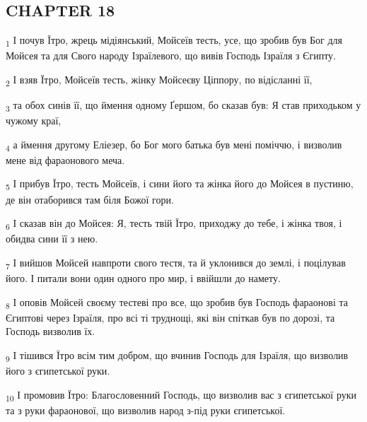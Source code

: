 \subsection{CHAPTER 18}
\begin{tcolorbox}
\textsubscript{1} І почув Їтро, жрець мідіянський, Мойсеїв тесть, усе, що зробив був Бог для Мойсея та для Свого народу Ізраїлевого, що вивів Господь Ізраїля з Єгипту.
\end{tcolorbox}
\begin{tcolorbox}
\textsubscript{2} І взяв Їтро, Мойсеїв тесть, жінку Мойсеєву Ціппору, по відісланні її,
\end{tcolorbox}
\begin{tcolorbox}
\textsubscript{3} та обох синів її, що ймення одному Ґершом, бо сказав був: Я став приходьком у чужому краї,
\end{tcolorbox}
\begin{tcolorbox}
\textsubscript{4} а ймення другому Еліезер, бо Бог мого батька був мені поміччю, і визволив мене від фараонового меча.
\end{tcolorbox}
\begin{tcolorbox}
\textsubscript{5} І прибув Їтро, тесть Мойсеїв, і сини його та жінка його до Мойсея в пустиню, де він отаборився там біля Божої гори.
\end{tcolorbox}
\begin{tcolorbox}
\textsubscript{6} І сказав він до Мойсея: Я, тесть твій Їтро, приходжу до тебе, і жінка твоя, і обидва сини її з нею.
\end{tcolorbox}
\begin{tcolorbox}
\textsubscript{7} І вийшов Мойсей навпроти свого тестя, та й уклонився до землі, і поцілував його. І питали вони один одного про мир, і ввійшли до намету.
\end{tcolorbox}
\begin{tcolorbox}
\textsubscript{8} І оповів Мойсей своєму тестеві про все, що зробив був Господь фараонові та Єгиптові через Ізраїля, про всі ті труднощі, які він спіткав був по дорозі, та Господь визволив їх.
\end{tcolorbox}
\begin{tcolorbox}
\textsubscript{9} І тішився Їтро всім тим добром, що вчинив Господь для Ізраїля, що визволив його з єгипетської руки.
\end{tcolorbox}
\begin{tcolorbox}
\textsubscript{10} І промовив Їтро: Благословенний Господь, що визволив вас з єгипетської руки та з руки фараонової, що визволив народ з-під руки єгипетської.
\end{tcolorbox}
